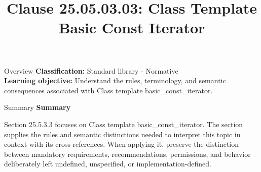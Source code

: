 \documentclass[10pt,letterpaper]{article}
\title{Clause 25.05.03.03: Class Template Basic Const Iterator}
\author{}
\date{}
\begin{document}
\maketitle
\begin{CornellOverviewBox}{Overview}
\textbf{Classification:} Standard library - Normative\\[2pt]
\textbf{Learning objective:} Understand the rules, terminology, and semantic consequences associated with Class template basic\_const\_iterator.
\end{CornellOverviewBox}\begin{CornellSummaryBox}{Summary}
{\sffamily\bfseries\color{Accent} Summary}\par\vspace{3pt}Section 25.5.3.3 focuses on Class template basic\_const\_iterator. The section supplies the rules and semantic distinctions needed to interpret this topic in context with its cross-references. When applying it, preserve the distinction between mandatory requirements, recommendations, permissions, and behavior deliberately left undefined, unspecified, or implementation-defined.
\end{CornellSummaryBox}
\end{document}
